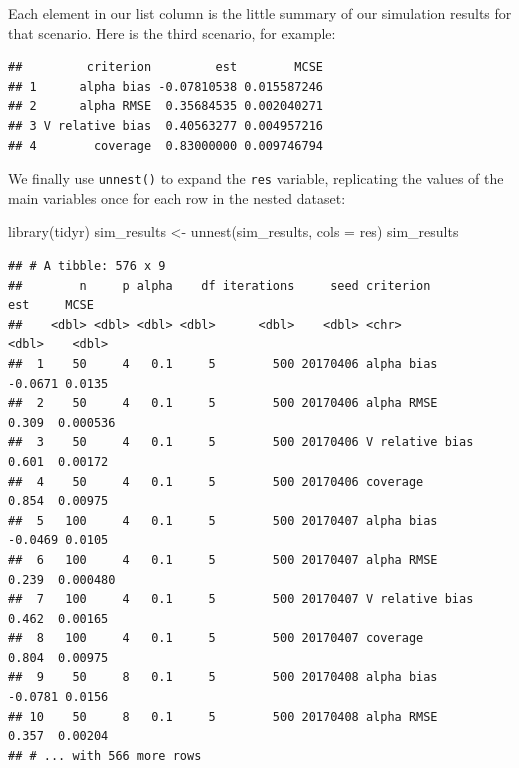 \documentclass[
]{book}
\newenvironment{Shaded}{\begin{snugshade}}{\end{snugshade}}
\newcommand{\AttributeTok}[1]{\textcolor[rgb]{0.77,0.63,0.00}{#1}}
\newcommand{\DecValTok}[1]{\textcolor[rgb]{0.00,0.00,0.81}{#1}}
\newcommand{\FunctionTok}[1]{\textcolor[rgb]{0.00,0.00,0.00}{#1}}
\newcommand{\NormalTok}[1]{#1}
\newcommand{\OtherTok}[1]{\textcolor[rgb]{0.56,0.35,0.01}{#1}}
\newcommand{\SpecialCharTok}[1]{\textcolor[rgb]{0.00,0.00,0.00}{#1}}
\begin{document}
Each element in our list column is the little summary of our simulation results for that scenario.
Here is the third scenario, for example:

\begin{Shaded}
\end{Shaded}

\begin{verbatim}
##         criterion         est        MCSE
## 1      alpha bias -0.07810538 0.015587246
## 2      alpha RMSE  0.35684535 0.002040271
## 3 V relative bias  0.40563277 0.004957216
## 4        coverage  0.83000000 0.009746794
\end{verbatim}

We finally use \texttt{unnest()} to expand the \texttt{res} variable, replicating the values of the main variables once for each row in the nested dataset:

\begin{Shaded}
\begin{Highlighting}[]
\FunctionTok{library}\NormalTok{(tidyr)}
\NormalTok{sim\_results }\OtherTok{\textless{}{-}} \FunctionTok{unnest}\NormalTok{(sim\_results, }\AttributeTok{cols =}\NormalTok{ res)}
\NormalTok{sim\_results}
\end{Highlighting}
\end{Shaded}

\begin{verbatim}
## # A tibble: 576 x 9
##        n     p alpha    df iterations     seed criterion           est     MCSE
##    <dbl> <dbl> <dbl> <dbl>      <dbl>    <dbl> <chr>             <dbl>    <dbl>
##  1    50     4   0.1     5        500 20170406 alpha bias      -0.0671 0.0135  
##  2    50     4   0.1     5        500 20170406 alpha RMSE       0.309  0.000536
##  3    50     4   0.1     5        500 20170406 V relative bias  0.601  0.00172 
##  4    50     4   0.1     5        500 20170406 coverage         0.854  0.00975 
##  5   100     4   0.1     5        500 20170407 alpha bias      -0.0469 0.0105  
##  6   100     4   0.1     5        500 20170407 alpha RMSE       0.239  0.000480
##  7   100     4   0.1     5        500 20170407 V relative bias  0.462  0.00165 
##  8   100     4   0.1     5        500 20170407 coverage         0.804  0.00975 
##  9    50     8   0.1     5        500 20170408 alpha bias      -0.0781 0.0156  
## 10    50     8   0.1     5        500 20170408 alpha RMSE       0.357  0.00204 
## # ... with 566 more rows
\end{verbatim}
\end{document}
